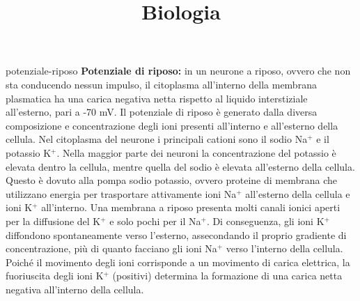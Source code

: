 \documentclass[preview]{standalone}
\begin{document}
\title{Biologia}
\genpage


\begin{snippet}{potenziale-riposo}
    \textbf{Potenziale di riposo:} in un neurone a riposo, ovvero che non sta conducendo nessun impulso, il citoplasma
all'interno della membrana plasmatica ha una carica negativa netta rispetto al liquido
interstiziale all'esterno, pari a -70 mV. Il potenziale di riposo è generato dalla diversa
composizione e concentrazione degli ioni presenti all'interno e all'esterno della cellula. Nel
citoplasma del neurone i principali cationi sono il sodio Na\({}^+\) e il potassio K\({}^+\). Nella maggior
parte dei neuroni la concentrazione del potassio è elevata dentro la cellula, mentre quella
del sodio è elevata all'esterno della cellula. Questo è dovuto alla pompa sodio potassio,
ovvero proteine di membrana che utilizzano energia per trasportare attivamente ioni Na\({}^+\)
all'esterno della cellula e ioni K\({}^+\) all'interno. Una membrana a riposo presenta molti canali
ionici aperti per la diffusione del K\({}^+\) e solo pochi per il Na\({}^+\). Di conseguenza, gli ioni K\({}^+\)
diffondono spontaneamente verso l'esterno, assecondando il proprio gradiente di
concentrazione, più di quanto facciano gli ioni Na\({}^+\) verso l'interno della cellula. Poiché il
movimento degli ioni corrisponde a un movimento di carica elettrica, la fuoriuscita degli ioni
K\({}^+\) (positivi) determina la formazione di una carica netta negativa all'interno della cellula.
\end{snippet}

\end{document}
